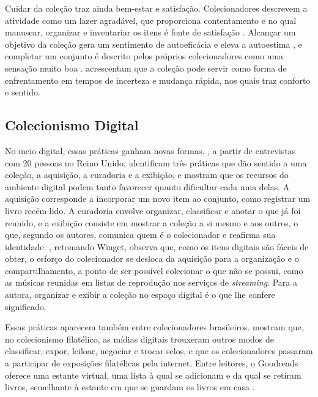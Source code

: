 Cuidar da coleção traz ainda bem-estar e satisfação. Colecionadores descrevem a atividade como um lazer agradável, que proporciona contentamento e no qual
manusear, organizar e inventariar os itens é fonte de satisfação \cite{Oliveira2017}. Alcançar um objetivo da coleção gera um sentimento de autoeficácia
e eleva a autoestima \cite{Silva2020}, e completar um conjunto é descrito pelos próprios colecionadores como uma sensação muito boa
\cite{Correia2026}.  acrescentam que a coleção pode servir como forma de enfrentamento em tempos de incerteza e mudança rápida, nos
quais traz conforto e sentido.

\subsection{Colecionismo Digital}
\label{subsec:colecionismo-digital}

No meio digital, essas práticas ganham novas formas. , a partir de entrevistas com 20 pessoas no Reino Unido, identificam três
práticas que dão sentido a uma coleção, a aquisição, a curadoria e a exibição, e mostram que os recursos do ambiente digital podem tanto favorecer quanto
dificultar cada uma delas. A aquisição corresponde a incorporar um novo item ao conjunto, como registrar um livro recém-lido. A curadoria envolve organizar,
classificar e anotar o que já foi reunido, e a exibição consiste em mostrar a coleção a si mesmo e aos outros, o que, segundo os autores, comunica quem é o
colecionador e reafirma sua identidade. , retomando Winget, observa que, como os itens digitais são fáceis de obter, o esforço
do colecionador se desloca da aquisição para a organização e o compartilhamento, a ponto de ser possível colecionar o que não se possui, como as músicas reunidas
em listas de reprodução nos serviços de \textit{streaming}. Para a autora, organizar e exibir a coleção no espaço digital é o que lhe confere significado.

Essas práticas aparecem também entre colecionadores brasileiros.  mostram que, no colecionismo filatélico, as mídias digitais
trouxeram outros modos de classificar, expor, leiloar, negociar e trocar selos, e que os colecionadores passaram a participar de exposições filatélicas pela
internet. Entre leitores, o Goodreads oferece uma estante virtual, uma lista à qual se adicionam e da qual se retiram livros,
semelhante à estante em que se guardam os livros em casa \cite{Silva2022}.


